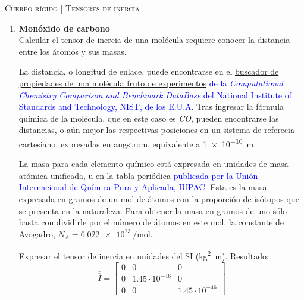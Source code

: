 \documentclass[11pt, spanish, a4paper, twoside]{article}
\begin{document}
\begin{center}
  \textsc{\large Cuerpo rígido | Tensores de inercia}
\end{center}


\begin{enumerate}
	\item
	\textbf{Monóxido de carbono}\\
	Calcular el tensor de inercia de una molécula requiere conocer la distancia entre los átomos y sus masas.

	La distancia, o longitud de enlace, puede encontrarse en el \textcolor{blue}{\href{https://cccbdb.nist.gov/exp1x.asp}{buscador de propiedades de una molécula fruto de experimentos} de la \emph{Computational Chemistry Comparison and Benchmark DataBase} del National Institute of Standards and Technology, NIST, de los E.U.A}.
	Tras ingresar la fórmula química de la molécula, que en este caso es \emph{CO}, pueden encontrarse las distancias, o aún mejor las respectivas posiciones en un sistema de referecia cartesiano, expresadas en \si{angstrom}, equivalente a \SI{1e-10}{\metre}.

	La masa para cada elemento químico está expresada en unidades de masa atómica unificada, \si{\atomicmassunit} en la \textcolor{blue}{\href{https://iupac.org/what-we-do/periodic-table-of-elements/}{tabla periódica} publicada por la Unión Internacional de Química Pura y Aplicada, IUPAC}.
	Esta es la masa expresada en gramos de un mol de átomos con la proporción de isótopos que se presenta en la naturaleza.
	Para obtener la masa en gramos de uno sólo basta con dividirle por el número de átomos en este mol, la constante de Avogadro, \(N_A = \SI{6.022e23}{\per\mole}\).
	
	Expresar el tensor de inercia en unidades del SI (\si{\kilogram \squared \metre}).
	Resultado:\\
	\[
		\overline{\overline{I}} = \left[\begin{matrix}0 & 0 & 0\\0 & 1.45 \cdot 10^{-46} & 0\\0 & 0 & 1.45 \cdot 10^{-46}\end{matrix}\right]
	\]




\end{enumerate}
\end{document}
